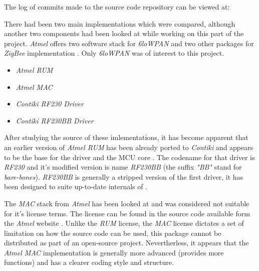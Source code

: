  The log of commits made to the source code repository can be viewed at:

\footnotesize
{}
\normalsize

  There had been two main implementations which were compared, although
 another two components had been looked at while working on this part
 of the project. \emph{Atmel} offers two software stack for \emph{6loWPAN}
 and two other packages for \emph{ZigBee} implementation \cite{atmel:avr2102,
 atmel:zbpro}. Only \emph{6loWPAN} was of interest to this project.

\begin{itemize}

	\item\emph{Atmel RUM} \cite{atmel:avr2070}
	\item\emph{Atmel MAC} \cite{atmel:avr2025}
	\item\emph{Contiki RF230 Driver}
	\item\emph{Contiki RF230BB Driver}

\end{itemize}

  After studying the source of these imlementations, it has become apparent
 that an earlier version of \emph{Atmel RUM} has been already ported to
 \emph{Contiki} and appears to be the base for the  driver
 and the MCU core . The codename for that driver is
 \emph{RF230} and it's modified version is name \emph{RF230BB} (the
 suffix \emph{"BB"} stand for \emph{bare-bones}). \emph{RF230BB} is
 generally a stripped version of the first driver, it has been designed
 to suite up-to-date internals of \ContikiOS.

  The \emph{MAC} stack from \emph{Atmel} has been looked at and was
 considered  not suitable for it's license terms. The license can be
 found in the source code available form the \emph{Atmel} website
 \cite{atmel:avr2025}. Unlike the \emph{RUM} license, the \emph{MAC}
 license dictates a set of limitation on how the source code can be used, 
 this package cannot be distributed as part of an open-source project.
 Nevertherless, it appears that the \emph{Atmel MAC} implementation is
 generally more advanced (provides more functions) and has a clearer
 coding style and structure.
 
